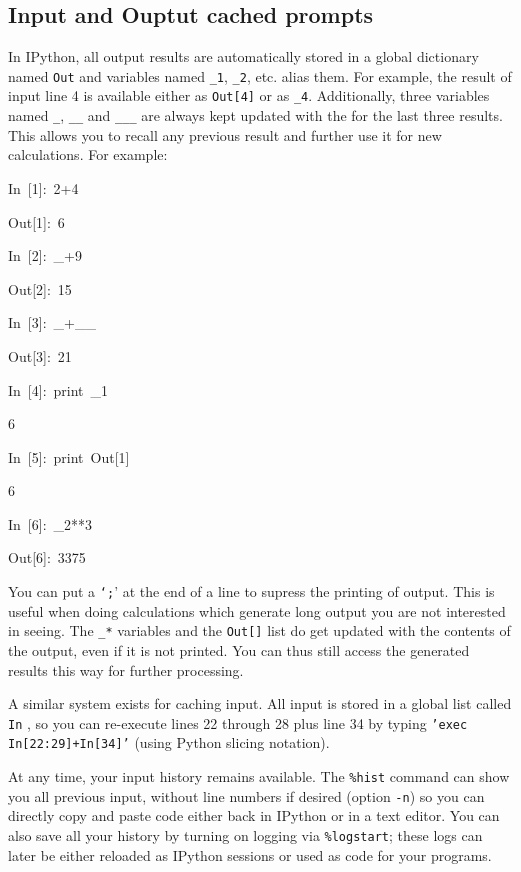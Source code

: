 \subsection{Input and Ouptut cached prompts}

In IPython, all output results are automatically stored in a global
dictionary named \texttt{Out} and variables named \texttt{\_1}, \texttt{\_2},
etc. alias them. For example, the result of input line 4 is available
either as \texttt{Out{[}4]} or as \texttt{\_4}. Additionally, three
variables named \texttt{\_}, \texttt{\_\_} and \texttt{\_\_\_} are
always kept updated with the for the last three results. This allows
you to recall any previous result and further use it for new calculations.
For example:

\begin{lyxcode}
In~{[}1]:~2+4

Out{[}1]:~6



In~{[}2]:~\_+9

Out{[}2]:~15



In~{[}3]:~\_+\_\_

Out{[}3]:~21



In~{[}4]:~print~\_1

6



In~{[}5]:~print~Out{[}1]

6



In~{[}6]:~\_2{*}{*}3

Out{[}6]:~3375
\end{lyxcode}
You can put a \texttt{`;}' at the end of a line to supress the printing
of output. This is useful when doing calculations which generate long
output you are not interested in seeing. The \texttt{\_{*}} variables
and the \texttt{Out{[}]} list do get updated with the contents of
the output, even if it is not printed. You can thus still access the
generated results this way for further processing.

A similar system exists for caching input. All input is stored in
a global list called \texttt{In} , so you can re-execute lines 22
through 28 plus line 34 by typing \texttt{'exec In{[}22:29]+In{[}34]'}
(using Python slicing notation). 

At any time, your input history remains available. The \texttt{\%hist}
command can show you all previous input, without line numbers if desired
(option \texttt{-n}) so you can directly copy and paste code either
back in IPython or in a text editor. You can also save all your history
by turning on logging via \texttt{\%logstart}; these logs can later
be either reloaded as IPython sessions or used as code for your programs.

